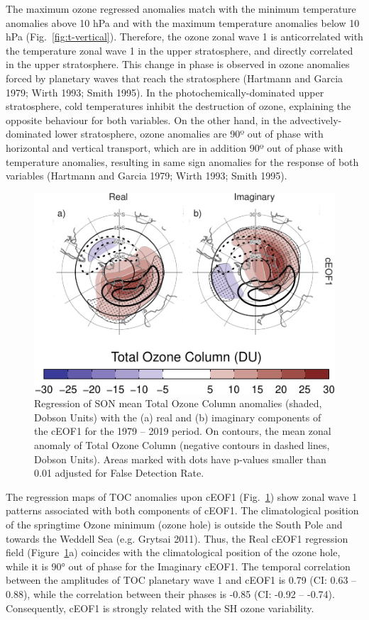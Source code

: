 \documentclass[smallextended]{svjour3}       %
\begin{document}
The maximum ozone regressed anomalies match with the minimum temperature anomalies above 10 hPa and with the maximum temperature anomalies below 10 hPa (Fig.~\ref{fig:t-vertical}).
Therefore, the ozone zonal wave 1 is anticorrelated with the temperature zonal wave 1 in the upper stratosphere, and directly correlated in the upper stratosphere.
This change in phase is observed in ozone anomalies forced by planetary waves that reach the stratosphere (Hartmann and Garcia 1979; Wirth 1993; Smith 1995).
In the photochemically-dominated upper stratosphere, cold temperatures inhibit the destruction of ozone, explaining the opposite behaviour for both variables.
On the other hand, in the advectively-dominated lower stratosphere, ozone anomalies are 90º out of phase with horizontal and vertical transport, which are in addition 90º out of phase with temperature anomalies, resulting in same sign anomalies for the response of both variables (Hartmann and Garcia 1979; Wirth 1993; Smith 1995).



\begin{figure}
\centering
\includegraphics{../figures/o3-regr-1.pdf}
\caption{\label{fig:o3-regr}Regression of SON mean Total Ozone Column anomalies (shaded, Dobson Units) with the (a) real and (b) imaginary components of the cEOF1 for the 1979 -- 2019 period. On contours, the mean zonal anomaly of Total Ozone Column (negative contours in dashed lines, Dobson Units). Areas marked with dots have p-values smaller than 0.01 adjusted for False Detection Rate.}
\end{figure}



The regression maps of TOC anomalies upon cEOF1 (Fig.~\ref{fig:o3-regr}) show zonal wave 1 patterns associated with both components of cEOF1.
The climatological position of the springtime Ozone minimum (ozone hole) is outside the South Pole and towards the Weddell Sea (e.g. Grytsai 2011).
Thus, the Real cEOF1 regression field (Figure~\ref{fig:o3-regr}a) coincides with the climatological position of the ozone hole, while it is 90° out of phase for the Imaginary cEOF1.
The temporal correlation between the amplitudes of TOC planetary wave 1 and cEOF1 is 0.79 (CI: 0.63 -- 0.88), while the correlation between their phases is -0.85 (CI: -0.92 -- -0.74).
Consequently, cEOF1 is strongly related with the SH ozone variability.
\end{document}
